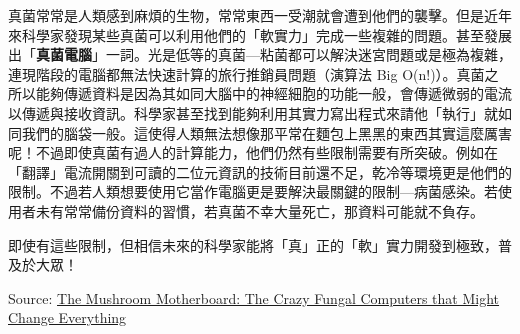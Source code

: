 \documentclass{article}
\begin{document}
\begin{frame}
真菌常常是人類感到麻煩的生物，常常東西一受潮就會遭到他們的襲擊。但是近年來科學家發現某些真菌可以利用他們的「軟實力」完成一些複雜的問題。甚至發展出「\textbf{真菌電腦}」一詞。光是低等的真菌—粘菌都可以解決迷宮問題或是極為複雜，連現階段的電腦都無法快速計算的旅行推銷員問題（演算法 Big O(n!)）。真菌之所以能夠傳遞資料是因為其如同大腦中的神經細胞的功能一般，會傳遞微弱的電流以傳遞與接收資訊。科學家甚至找到能夠利用其實力寫出程式來請他「執行」就如同我們的腦袋一般。這使得人類無法想像那平常在麵包上黑黑的東西其實這麼厲害呢！不過即使真菌有過人的計算能力，他們仍然有些限制需要有所突破。例如在「翻譯」電流開關到可讀的二位元資訊的技術目前還不足，乾冷等環境更是他們的限制。不過若人類想要使用它當作電腦更是要解決最關鍵的限制—病菌感染。若使用者未有常常備份資料的習慣，若真菌不幸大量死亡，那資料可能就不負存。

即使有這些限制，但相信未來的科學家能將「真」正的「軟」實力開發到極致，普及於大眾！

Source: \href{https://www.youtube.com/watch?v=5mIWo6dgTmI}{The Mushroom Motherboard: The Crazy Fungal Computers that Might Change Everything}
\end{frame}
\end{document}
